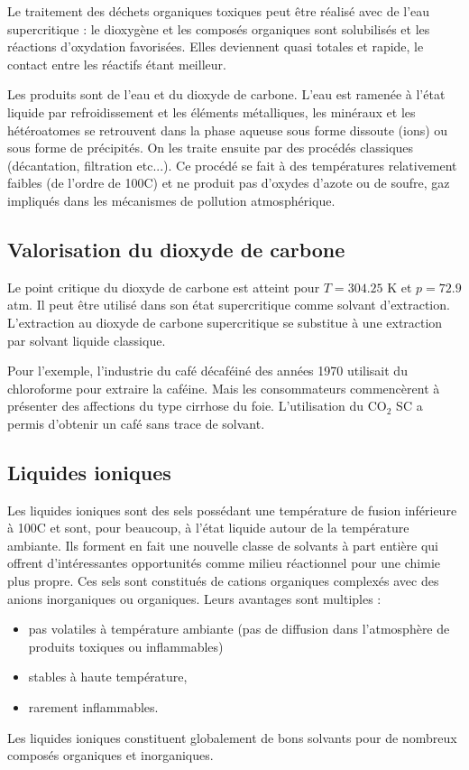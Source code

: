 \documentclass[11pt,a4paper]{report}
\begin{document}
Le traitement des déchets organiques toxiques peut être réalisé avec de l'eau supercritique : le dioxygène et les composés organiques sont solubilisés et les réactions d'oxydation favorisées. Elles deviennent quasi totales et rapide, le contact entre les réactifs étant meilleur.

Les produits sont de l'eau et du dioxyde de carbone. L'eau est ramenée à l'état liquide par refroidissement et les éléments métalliques, les minéraux et les hétéroatomes se retrouvent dans la phase aqueuse sous forme dissoute (ions) ou sous forme de précipités. On les traite ensuite par des procédés classiques (décantation, filtration etc...). Ce procédé se fait à des températures relativement faibles (de l'ordre de 100\degree C) et ne produit pas d'oxydes d'azote ou de soufre, gaz impliqués dans les mécanismes de pollution atmosphérique.

\subsection{Valorisation du dioxyde de carbone}

Le point critique du dioxyde de carbone est atteint pour $T = 304.25$ K et $p = 72.9$ atm. Il peut être utilisé dans son état supercritique comme solvant d'extraction. L'extraction au dioxyde de carbone supercritique se substitue à une extraction par solvant liquide classique. 

Pour l'exemple, l'industrie du café décaféiné des années 1970 utilisait du chloroforme pour extraire la
caféine. Mais les consommateurs commencèrent à présenter des affections du type cirrhose du foie. L'utilisation du $\text{CO}_2$ SC a permis d'obtenir un café sans trace de solvant.

\subsection{Liquides ioniques}

Les liquides ioniques sont des sels possédant une température de fusion inférieure à 100\degree C et sont, pour beaucoup, à l'état liquide autour de la température ambiante. Ils forment en fait une nouvelle classe de solvants à part entière qui offrent d'intéressantes opportunités comme milieu réactionnel pour une chimie plus propre. Ces sels sont constitués de cations organiques complexés avec des anions inorganiques ou organiques. Leurs avantages sont multiples :
\begin{itemize}
	\item pas volatiles à température ambiante (pas de diffusion dans l'atmosphère de 							produits toxiques ou inflammables)
	\item stables à haute température,
	\item rarement inflammables.
\end{itemize}
Les liquides ioniques constituent globalement de bons solvants pour de nombreux composés organiques et inorganiques.
\end{document}
